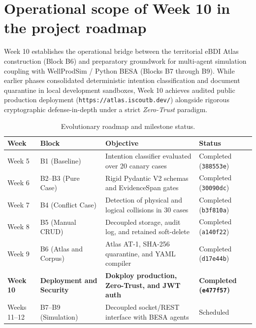 \documentclass[11pt,a4paper]{article}
\begin{document}
\section{Operational scope of Week 10 in the project roadmap}

Week 10 establishes the operational bridge between the territorial eBDI Atlas construction (Block B6) and preparatory groundwork for multi-agent simulation coupling with WellProdSim / Python BESA (Blocks B7 through B9). While earlier phases consolidated deterministic intention classification and document quarantine in local development sandboxes, Week 10 achieves audited public production deployment (\texttt{https://atlas.iscoutb.dev/}) alongside rigorous cryptographic defense-in-depth under a strict \textit{Zero-Trust} paradigm.

\begin{table}[H]
\centering
\small
\caption{Evolutionary roadmap and milestone status.}
\label{tab:roadmap_en}
\begin{tabularx}{\textwidth}{lp{3.4cm}p{5.0cm}X}
\toprule
\textbf{Week} & \textbf{Block} & \textbf{Objective} & \textbf{Status} \\
\midrule
Week 5 & B1 (Baseline) & Intention classifier evaluated over 20 canary cases & Completed (\texttt{388553e}) \\
Week 6 & B2--B3 (Pure Case) & Rigid Pydantic V2 schemas and EvidenceSpan gates & Completed (\texttt{30090dc}) \\
Week 7 & B4 (Conflict Case) & Detection of physical and logical collisions in 30 cases & Completed (\texttt{b3f810a}) \\
Week 8 & B5 (Manual CRUD) & Decoupled storage, audit log, and retained soft-delete & Completed (\texttt{a140f22}) \\
Week 9 & B6 (Atlas and Corpus) & Atlas AT-1, SHA-256 quarantine, and YAML compiler & Completed (\texttt{d17e44b}) \\
\textbf{Week 10} & \textbf{Deployment and Security} & \textbf{Dokploy production, Zero-Trust, and JWT auth} & \textbf{Completed (\texttt{e477f57})} \\
Weeks 11--12 & B7--B9 (Simulation) & Decoupled socket/REST interface with BESA agents & Scheduled \\
\bottomrule
\end{tabularx}
\end{table}
\end{document}
